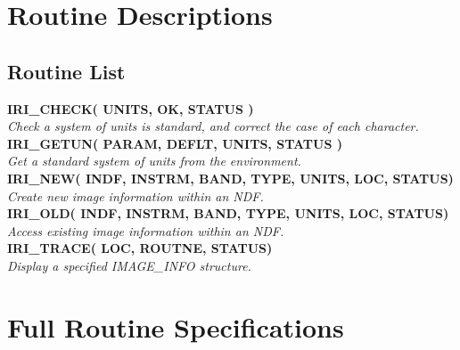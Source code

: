 \appendix
\section{Routine Descriptions}

\newcommand{\noteroutine}[2]{{\small \bf #1} \\
                              \hspace*{3em} {\em #2} \\[1.5ex]}

\subsection {Routine List}
\noteroutine{IRI\_CHECK( UNITS, OK, STATUS )}
   {Check a system of units is standard, and correct the case of each character.}
\noteroutine{IRI\_GETUN( PARAM, DEFLT, UNITS, STATUS )}
   {Get a standard system of units from the environment.}
\noteroutine{IRI\_NEW( INDF, INSTRM, BAND, TYPE, UNITS, LOC, STATUS)}
   {Create new image information within an NDF.}
\noteroutine{IRI\_OLD( INDF, INSTRM, BAND, TYPE, UNITS, LOC, STATUS)}
   {Access existing image information within an NDF.}
\noteroutine{IRI\_TRACE( LOC, ROUTNE, STATUS)}
   {Display a specified IMAGE\_INFO structure.}

\section{Full Routine Specifications}
\label {SEC:FULLSPEC}
\newlength{\sstbannerlength}
\newlength{\sstcaptionlength}
\newcommand{\sstroutine}[3]{
   \goodbreak
   \rule{\textwidth}{0.5mm}
   \vspace{-7ex}
   \newline
   \settowidth{\sstbannerlength}{{\Large {\bf #1}}}
   \setlength{\sstcaptionlength}{\textwidth}
   \addtolength{\sstbannerlength}{0.5em}
   \addtolength{\sstcaptionlength}{-2.0\sstbannerlength}
   \addtolength{\sstcaptionlength}{-4.45pt}
   \parbox[t]{\sstbannerlength}{\flushleft{\Large {\bf #1}}}
   \parbox[t]{\sstcaptionlength}{\center{\Large #2}}
   \parbox[t]{\sstbannerlength}{\flushright{\Large {\bf #1}}}
   \begin{description}
      #3
   \end{description}
}

\newcommand{\sstdescription}[1]{\item[Description:] #1}

